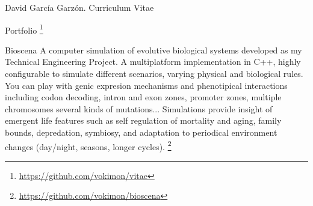 \documentclass{article}
\begin{document}
\begin{cv}{David García Garzón. Curriculum Vitae}
\begin{cvlist}{Portfolio}
\footnote{\href{https://github.com/vokimon/vitae}{https://github.com/vokimon/vitae}}
\item[Bioscena]
A computer simulation of evolutive biological systems developed as my Technical Engineering Project. A multiplatform implementation in C++, highly configurable to simulate different scenarios, varying physical and biological rules. You can play with genic expresion mechanisms and phenotipical interactions including codon decoding, intron and exon zones, promoter zones, multiple chromosomes several kinds of mutations... Simulations provide insight of emergent life features such as self regulation of mortality and aging, family bounds, depredation, symbiosy, and adaptation to periodical environment changes (day/night, seasons, longer cycles).
\footnote{\href{https://github.com/vokimon/bioscena}{https://github.com/vokimon/bioscena}}

\end{cvlist}


\vspace{2cm}

\end{cv}
\end{document}
